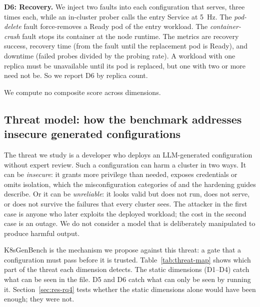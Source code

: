 \textbf{D6: Recovery.} We inject two faults into each configuration that serves, three times each, while an in-cluster prober calls the entry Service at 5~Hz. The \emph{pod-delete} fault force-removes a Ready pod of the entry workload. The \emph{container-crash} fault stops its container at the node runtime. The metrics are recovery success, recovery time (from the fault until the replacement pod is Ready), and downtime (failed probes divided by the probing rate). A workload with one replica must be unavailable until its pod is replaced, but one with two or more need not be. So we report D6 by replica count.

We compute no composite score across dimensions.

\subsection{Threat model: how the benchmark addresses insecure generated configurations}\label{sec:method-threat}

The threat we study is a developer who deploys an LLM-generated configuration without expert review. Such a configuration can harm a cluster in two ways. It can be \emph{insecure}: it grants more privilege than needed, exposes credentials or omits isolation, which the misconfiguration categories of \citet{rahman2023k8smisconfig} and the hardening guides \citep{nsacisa2022k8shardening,k8s_pod_security_standards} describe. Or it can be \emph{unreliable}: it looks valid but does not run, does not serve, or does not survive the failures that every cluster sees. The attacker in the first case is anyone who later exploits the deployed workload; the cost in the second case is an outage. We do not consider a model that is deliberately manipulated to produce harmful output.

K8sGenBench is the mechanism we propose against this threat: a gate that a configuration must pass before it is trusted. Table~\ref{tab:threat-map} shows which part of the threat each dimension detects. The static dimensions (D1--D4) catch what can be seen in the file. D5 and D6 catch what can only be seen by running it. Section~\ref{sec:res-rq4} tests whether the static dimensions alone would have been enough; they were not.

